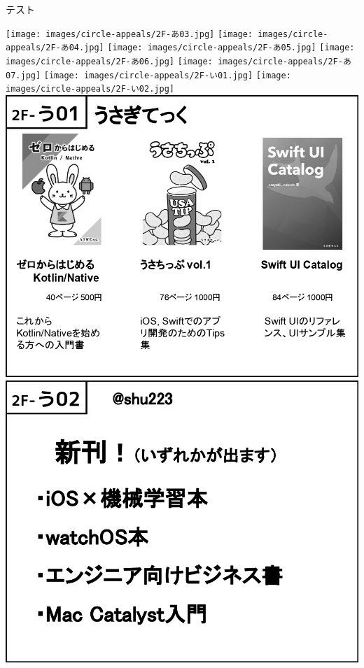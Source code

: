 \clearpage{\thispagestyle{empty}}

\begin{sffamily}
テスト
\end{sffamily}
\vspace{10pt}

\begin{center}

\texttt{[image: images/circle-appeals/2F-あ03.jpg]}
\texttt{[image: images/circle-appeals/2F-あ04.jpg]}
\texttt{[image: images/circle-appeals/2F-あ05.jpg]}
\texttt{[image: images/circle-appeals/2F-あ06.jpg]}
\texttt{[image: images/circle-appeals/2F-あ07.jpg]}
\texttt{[image: images/circle-appeals/2F-い01.jpg]}
\texttt{[image: images/circle-appeals/2F-い02.jpg]}
\includegraphics[width=0.9\linewidth]{images/circle-appeals/2F-う01.jpg}
\includegraphics[width=0.9\linewidth]{images/circle-appeals/2F-う02.jpg}

\end{center}

